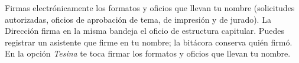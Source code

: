 \documentclass[11pt,a4paper]{article}
\begin{document}
{\small\tableofcontents}
\newpage
\begin{quevasahacer}
Firmas electrónicamente los formatos y oficios que llevan tu nombre (solicitudes autorizadas, oficios de aprobación de tema, de impresión y de jurado). La Dirección firma en la misma bandeja el oficio de estructura capitular. Puedes registrar un asistente que firme en tu nombre; la bitácora conserva quién firmó. En la opción \emph{Tesina} te toca firmar los formatos y oficios que llevan tu nombre.
\end{quevasahacer}



\end{document}
